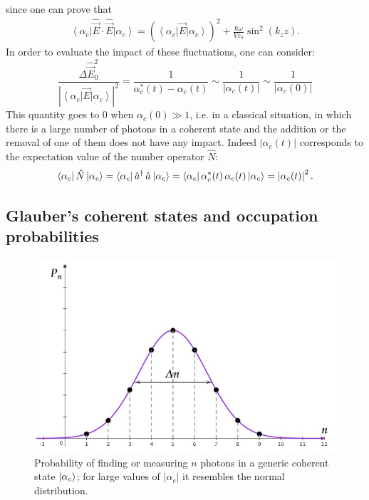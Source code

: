since one can prove that
\begin{align*}
    \left< \alpha_c \right| \hat{\Vec{E}} \cdot \hat{\Vec{E}}\left| \alpha_c \right> = \left( \left< \alpha_c \right| \Vec{E} \left| \alpha_c \right> \right)^2 + \frac{\hbar \omega}{V \varepsilon_0} \sin^2(k_z z). 
\end{align*}
In order to evaluate the impact of these fluctuations, one can consider:
\begin{equation}
    \frac{\Delta \hat{\vec{E}}_0^2}{\left| \left< \alpha_c \right| \Vec{E} \left| \alpha_c \right>\right|^2} = \frac{1}{\alpha_c^* (t) - \alpha_c(t)} \sim \frac{1}{\left| \alpha_c(t) \right|} \sim \frac{1}{\left| \alpha_c(0) \right|} 
\end{equation}
This quantity goes to 0 when $\alpha_c(0) \gg 1$, i.e. in a classical situation, in which there is a large number of photons in a coherent state and the addition or the removal of one of them does not have any impact. Indeed $\left| \alpha_c(t) \right|$ corresponds to the expectation value of the number operator $\hat{N}$: 
\begin{equation}
    \left< \alpha_c \right| \hat{N} \left| \alpha_c \right> = \left< \alpha_c \right| \hat{a}^{\dagger}_{} \, \hat{a}_{} \left| \alpha_c \right> = \left< \alpha_c \right| \alpha^*_c(t) \, \alpha_c(t) \left| \alpha_c \right> = \left| \alpha_c(t) \right|^2.
\end{equation}

\subsection{Glauber's coherent states and occupation probabilities}

\begin{figure}[t!]
\centering
\includegraphics[width=0.7\linewidth]{images/Poisson.png}
\caption{Probability of finding or measuring $n$ photons in a generic coherent state $\ket{\alpha_c}$; for large values of $| \alpha_c|$ it resembles the normal distribution.}
\label{fig:Poisson}
\end{figure}

